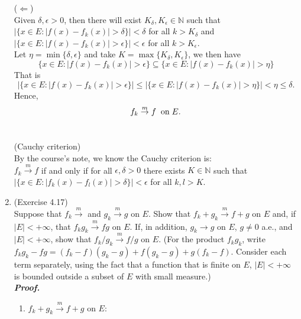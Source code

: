 \documentclass[a4paper,11pt]{article}
\begin{document}
\begin{enumerate}
($\Leftarrow$)\\
Given $\delta, \epsilon > 0$, then there will exist $K_{\delta}, K_{\epsilon} \in \mathbb{N}$ such that $|\{ x \in E : |f(x) - f_k(x)| > \delta \}| < \delta$ for all $k > K_{\delta}$ and $|\{ x \in E : |f(x) - f_k(x)| > \epsilon \}| < \epsilon$ for all $k > K_{\epsilon}$.\\
Let $\eta = \min \{ \delta, \epsilon \}$ and take $K = \max \{ K_{\delta}, K_{\epsilon} \}$, we then have
$$\{ x \in E : |f(x) - f_k(x)| > \epsilon\} \subseteq \{ x \in E : |f(x) - f_k(x)| > \eta\}$$
That is
$$|\{ x \in E : |f(x) - f_k(x)| > \epsilon \}| \leq |\{ x \in E : |f(x) - f_k(x)| > \eta\}| < \eta \leq \delta.$$
Hence,
$$f_k \overset{m}{\to} f \hspace{0.2cm} \mathrm{on} \hspace{0.1cm} E.$$\

(Cauchy criterion)\\
By the course's note, we know the Cauchy criterion is:\\
$f_k \overset{m}{\to} f$ if and only if for all $\epsilon, \delta > 0$ there exists $K \in \mathbb{N}$ such that $|\{ x \in E : | f_k(x) - f_l(x) | > \delta \}| < \epsilon$ for all $k, l > K$.\\


\item (Exercise 4.17)\\
Suppose that $f_k \overset{m}{\to}$ and $g_k \overset{m}{\to} g$ on $E$. Show that $f_k + g_k \overset{m}{\to} f + g$ on $E$ and, if $|E| < +\infty$, that $f_kg_k \overset{m}{\to} fg$ on $E$. If, in addition, $g_k \to g$ on $E$, $g \neq 0$ a.e., and $|E| < +\infty$, show that $f_k/g_k \overset{m}{\to} f/g$ on $E$. (For the product $f_kg_k$, write $f_kg_k - fg = (f_k - f)(g_k - g) + f(g_k - g) + g(f_k - f)$. Consider each term separately, using the fact that a function that is finite on $E$, $|E| < +\infty$ is bounded outside a subset of $E$ with small measure.)\\
\newline
\textit{\textbf {Proof.}}

\begin{enumerate}
\item $f_k + g_k \overset{m}{\to} f + g$ on $E$:\\


\end{enumerate}
\end{enumerate}
\end{document}
